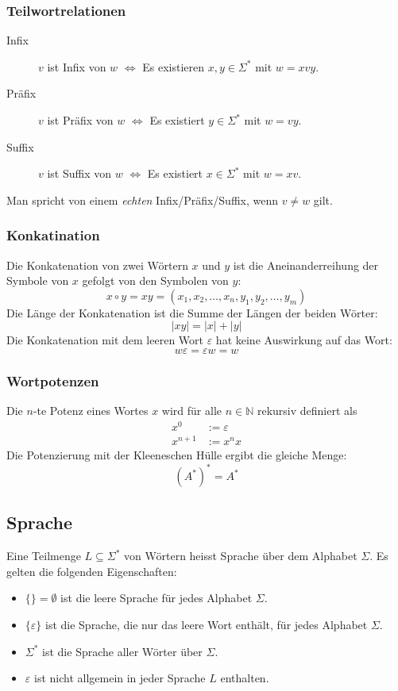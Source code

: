 \subsubsection{Teilwortrelationen}
\begin{description}
    \item[Infix] \(v\) ist Infix von \(w\) \(\iff\) Es existieren \(x,y \in \Sigma^*\) mit \(w = xvy\).
    \item[Präfix] \(v\) ist Präfix von \(w\) \(\iff\) Es existiert \(y \in \Sigma^*\) mit \(w = vy\).
    \item[Suffix] \(v\) ist Suffix von \(w\) \(\iff\) Es existiert \(x \in \Sigma^*\) mit \(w = xv\).
\end{description}
Man spricht von einem \emph{echten} Infix/Präfix/Suffix, wenn \(v \neq w\) gilt.


\subsubsection{Konkatination}
Die Konkatenation von zwei Wörtern \(x\) und \(y\) ist die Aneinanderreihung der Symbole von \(x\) gefolgt von den Symbolen von \(y\):
\[
    x \circ y = xy = (x_1, x_2, \dots, x_n, y_1, y_2, \dots, y_m)
\]
Die Länge der Konkatenation ist die Summe der Längen der beiden Wörter:
\[
    |xy| = |x| + |y|
\]
Die Konkatenation mit dem leeren Wort \(\varepsilon\) hat keine Auswirkung auf das Wort:
\[
    w\varepsilon = \varepsilon w = w
\]

\subsubsection{Wortpotenzen}
Die \(n\)-te Potenz eines Wortes \(x\) wird für alle \(n \in \mathbb{N}\) rekursiv definiert als
\begin{align*}
    x^0 &:= \varepsilon \\
    x^{n+1} &:= x^n x
\end{align*}
Die Potenzierung mit der Kleeneschen Hülle ergibt die gleiche Menge:
\[
    (A^*)^* = A^*
\]


\subsection{Sprache}
Eine Teilmenge \(L \subseteq \Sigma^*\) von Wörtern heisst Sprache über dem Alphabet \(\Sigma\).
Es gelten die folgenden Eigenschaften:
\begin{itemize}
    \item \(\{\} = \emptyset\) ist die leere Sprache für jedes Alphabet \(\Sigma\).
    \item \(\{\varepsilon\}\) ist die Sprache, die nur das leere Wort enthält, für jedes Alphabet \(\Sigma\).
    \item \(\Sigma^*\) ist die Sprache aller Wörter über \(\Sigma\).
    \item \(\varepsilon\) ist nicht allgemein in jeder Sprache \(L\) enthalten.
\end{itemize}


